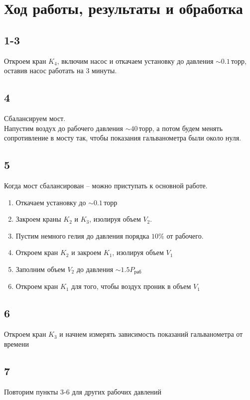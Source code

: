 \section*{Ход работы, результаты и обработка}
\subsection*{1-3}
Откроем кран $K_4$, включим насос и откачаем установку до давления $\sim0.1\,\text{торр}$, оставив насос работать на 3 минуты.
\subsection*{4}
Сбалансируем мост.\\
Напустим воздух до рабочего давления $\sim40\,\text{торр}$, а потом будем менять сопротивление в мосту так, чтобы показания гальванометра были около нуля.
\subsection*{5}
Когда мост сбалансирован -- можно приступать к основной работе.
\begin{enumerate}
	\item Откачаем установку до $\sim0.1\,\text{торр}$
	\item Закроем краны $K_2$ и $K_3$, изолируя объем $V_2$.
	\item Пустим немного гелия до давления порядка $10\%$ от рабочего.
	\item Откроем кран $K_2$ и закроем $K_1$, изолируя объем $V_1$
	\item Заполним объем $V_2$ до давления $\sim 1.5P_\text{раб}$
	\item Откроем кран $K_1$ для того, чтобы воздух проник в объем $V_1$
\end{enumerate}
\subsection*{6}
Откроем кран $K_3$ и начнем измерять зависимость показаний гальванометра от времени
\subsection*{7}
Повторим пункты 3-6 для других рабочих давлений

